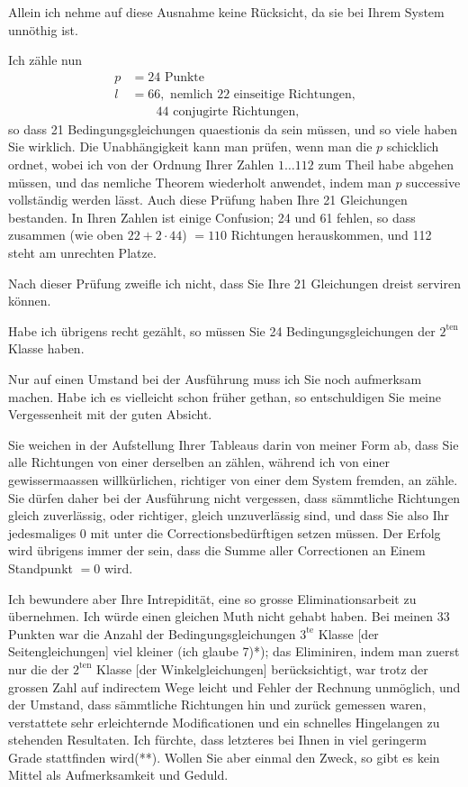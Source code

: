 \documentclass[12pt,a4paper]{article}
\theoremstyle{plain}
\theoremstyle{definition}
\theoremstyle{remark}
\begin{document}
Allein ich nehme auf diese Ausnahme keine R\"ucksicht, da sie bei Ihrem System unn\"othig ist.

Ich z\"ahle nun
\begin{align*}
p &= 24 \text{ Punkte}\\
l &= 66, \text{ nemlich 22 einseitige Richtungen,}\\
  &\quad\quad\text{44 conjugirte Richtungen,}
\end{align*}
so dass 21 Bedingungsgleichungen quaestionis da sein m\"ussen, und so viele haben Sie wirklich. Die Unabh\"angigkeit kann man pr\"ufen, wenn man die $p$ schicklich ordnet, wobei ich von der Ordnung Ihrer Zahlen $1 \ldots 112$ zum Theil habe abgehen m\"ussen, und das nemliche Theorem wiederholt anwendet, indem man $p$ successive vollst\"andig werden l\"asst. Auch diese Pr\"ufung haben Ihre 21 Gleichungen bestanden. In Ihren Zahlen ist einige Confusion; 24 und 61 fehlen, so dass zusammen (wie oben $22 + 2 \cdot 44$) $= 110$ Richtungen herauskommen, und 112 steht am unrechten Platze.

Nach dieser Pr\"ufung zweifle ich nicht, dass Sie Ihre 21 Gleichungen dreist serviren k\"onnen.

Habe ich \"ubrigens recht gez\"ahlt, so m\"ussen Sie 24 Bedingungsgleichungen der $2^{\mathrm{ten}}$ Klasse haben.

Nur auf einen Umstand bei der Ausf\"uhrung muss ich Sie noch aufmerksam machen. Habe ich es vielleicht schon fr\"uher gethan, so entschuldigen Sie meine Vergessenheit mit der guten Absicht.

Sie weichen in der Aufstellung Ihrer Tableaus darin von meiner Form ab, dass Sie alle Richtungen von einer derselben an z\"ahlen, w\"ahrend ich von einer gewissermaassen willk\"urlichen, richtiger von einer dem System fremden, an z\"ahle. Sie d\"urfen daher bei der Ausf\"uhrung nicht vergessen, dass s\"ammtliche Richtungen gleich zuverl\"assig, oder richtiger, gleich unzuverl\"assig sind, und dass Sie also Ihr jedesmaliges 0 mit unter die Correctionsbed\"urftigen setzen m\"ussen. Der Erfolg wird \"ubrigens immer der sein, dass die Summe aller Correctionen an Einem Standpunkt $= 0$ wird.

Ich bewundere aber Ihre Intrepidit\"at, eine so grosse Eliminationsarbeit zu \"ubernehmen. Ich w\"urde einen gleichen Muth nicht gehabt haben. Bei meinen 33 Punkten war die Anzahl der Bedingungsgleichungen $3^{\mathrm{te}}$ Klasse [der Seitengleichungen] viel kleiner (ich glaube 7)*); das Eliminiren, indem man zuerst nur die der $2^{\mathrm{ten}}$ Klasse [der Winkelgleichungen] ber\"ucksichtigt, war trotz der grossen Zahl auf indirectem Wege leicht und Fehler der Rechnung unm\"oglich, und der Umstand, dass s\"ammtliche Richtungen hin und zur\"uck gemessen waren, verstattete sehr erleichternde Modificationen und ein schnelles Hingelangen zu stehenden Resultaten. Ich f\"urchte, dass letzteres bei Ihnen in viel geringerm Grade stattfinden wird(**). Wollen Sie aber einmal den Zweck, so gibt es kein Mittel als Aufmerksamkeit und Geduld.
\end{document}
